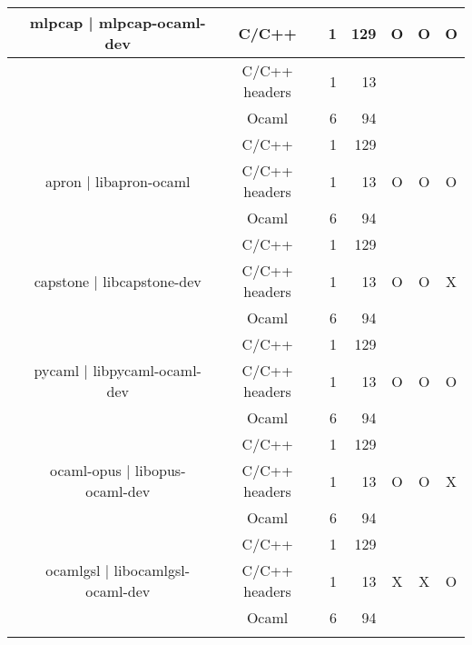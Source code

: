 \documentclass[11pt,a4paper]{article}
\begin{document}
 \begin{table}[h,t] 
\begin{tabular}{|>{\centering}m{3cm}| c|c|r|r| c| c|c|}
\hline
 \multirow{18}{3cm}{bindings with C libraries} & \multirow{3}{3cm}{mlpcap | mlpcap-ocaml-dev} & C/C++ & 1 & 129 & \multirow{3}{*}{O} & \multirow{3}{*}{O} & \multirow{3}{*}{O}\\
 \cline{3-5}
 & &                           C/C++ headers & 1 & 13 & & & \\
 \cline{3-5}
 & &                          Ocaml & 6 & 94 & & & \\
 \cline{2-8}

 &\multirow{3}{3cm}{apron | libapron-ocaml} & C/C++ & 1 & 129 & \multirow{3}{*}{O} & \multirow{3}{*}{O} & \multirow{3}{*}{O}\\
\cline{3-5}
& &                           C/C++ headers & 1 & 13 & & & \\
\cline{3-5}
& &                          Ocaml & 6 & 94 & & & \\
\cline{2-8}

 &\multirow{3}{3cm}{capstone | libcapstone-dev } & C/C++ & 1 & 129 & \multirow{3}{*}{O} & \multirow{3}{*}{O} & \multirow{3}{*}{X}\\
\cline{3-5}
& &                           C/C++ headers & 1 & 13 & & & \\
\cline{3-5}
& &                          Ocaml & 6 & 94 & & & \\
\cline{2-8}




 &\multirow{3}{3cm}{pycaml | libpycaml-ocaml-dev} & C/C++ & 1 & 129 & \multirow{3}{*}{O} & \multirow{3}{*}{O} & \multirow{3}{*}{O}\\
\cline{3-5}
& &                           C/C++ headers & 1 & 13 & & & \\
\cline{3-5}
& &                          Ocaml & 6 & 94 & & & \\
\cline{2-8}



 &\multirow{3}{3cm}{ocaml-opus | libopus-ocaml-dev} & C/C++ & 1 & 129 & \multirow{3}{*}{O} & \multirow{3}{*}{O} & \multirow{3}{*}{X}\\
\cline{3-5}
& &                           C/C++ headers & 1 & 13 & & & \\
\cline{3-5}
& &                          Ocaml & 6 & 94 & & & \\
\cline{2-8}



 &\multirow{3}{3cm}{ocamlgsl | libocamlgsl-ocaml-dev} & C/C++ & 1 & 129 & \multirow{3}{*}{X} & \multirow{3}{*}{X} & \multirow{3}{*}{O}\\
\cline{3-5}
& &                           C/C++ headers & 1 & 13 & & & \\
\cline{3-5}
& &                          Ocaml & 6 & 94 & & & \\
\cline{2-8}





\end{tabular}
\end{table}
\end{document}
